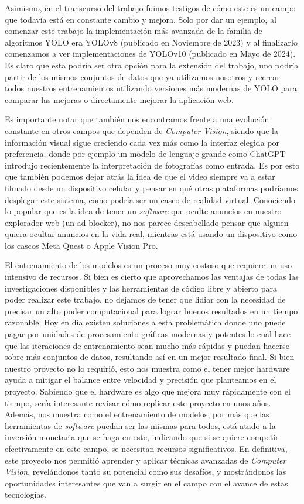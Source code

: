 \documentclass[a4paper]{article}
\begin{document}
Asimismo, en el transcurso del trabajo fuimos testigos de cómo este es un campo que todavía está en constante cambio y mejora. Solo por dar un ejemplo, al comenzar este trabajo la implementación más avanzada de la familia de algoritmos YOLO era YOLOv8 (publicado en Noviembre de 2023) y al finalizarlo comenzamos a ver implementaciones de YOLOv10 (publicado en Mayo de 2024). Es claro que esta podría ser otra opción para la extensión del trabajo, uno podría partir de los mismos conjuntos de datos que ya utilizamos nosotros y recrear todos nuestros entrenamientos utilizando versiones más modernas de YOLO para comparar las mejoras o directamente mejorar la aplicación web.

Es importante notar que también nos encontramos frente a una evolución constante en otros campos que dependen de \textit{Computer Vision}, siendo que la información visual sigue creciendo cada vez más como la interfaz elegida por preferencia, donde por ejemplo un modelo de lenguaje grande como ChatGPT introdujo recientemente la interpretación de fotografías como entrada.
Es por esto que también podemos dejar atrás la idea de que el video siempre va a estar filmado desde un dispositivo celular y pensar en qué otras plataformas podríamos desplegar este sistema, como podría ser un casco de realidad virtual. Conociendo lo popular que es la idea de tener un \textit{software} que oculte anuncios en nuestro explorador web (un ad blocker), no nos parece descabellado pensar que alguien quiera ocultar anuncios en la vida real, mientras está usando un dispositivo como los cascos Meta Quest o Apple Vision Pro.

El entrenamiento de los modelos es un proceso muy costoso que requiere un uso intensivo de recursos. Si bien es cierto que aprovechamos las ventajas de todas las investigaciones disponibles y las herramientas de código libre y abierto para poder realizar este trabajo, no dejamos de tener que lidiar con la necesidad de precisar un alto poder computacional para lograr buenos resultados en un tiempo razonable. Hoy en día existen soluciones a esta problemática donde uno puede pagar por unidades de procesamiento gráficas modernas y potentes lo cual hace que las iteraciones de entrenamiento sean mucho más rápidas y puedan hacerse sobre más conjuntos de datos, resultando así en un mejor resultado final. Si bien nuestro proyecto no lo requirió, esto nos muestra como el tener mejor hardware ayuda a mitigar el balance entre velocidad y precisión que planteamos en el proyecto. Sabiendo que el hardware es algo que mejora muy rápidamente con el tiempo, sería interesante revisar cómo replicar este proyecto en unos años. Además, nos muestra como el entrenamiento de modelos, por más que las herramientas de \textit{software} puedan ser las mismas para todos, está atado a la inversión monetaria que se haga en este, indicando que si se quiere competir efectivamente en este campo, se necesitan recursos significativos.
En definitiva, este proyecto nos permitió aprender y aplicar técnicas avanzadas de \textit{Computer Vision}, revelándonos tanto su potencial como sus desafíos, y mostrándonos las oportunidades interesantes que van a surgir en el campo con el avance de estas tecnologías.
\end{document}
